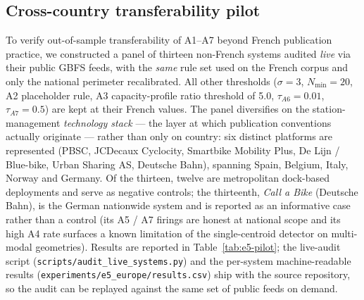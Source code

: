 \documentclass[11pt,a4paper]{article}
\begin{document}
\subsection{Cross-country transferability pilot}
To verify out-of-sample transferability of A1--A7 beyond French
publication practice, we constructed a panel of thirteen non-French
systems audited \emph{live} via their public GBFS feeds, with the
\emph{same} rule set used on the French corpus and only the
national perimeter recalibrated. All other thresholds ($\sigma =
3$, $N_{\min} = 20$, A2 placeholder rule, A3 capacity-profile
ratio threshold of 5.0, $\tau_{A6} = 0.01$, $\tau_{A7} = 0.5$) are
kept at their French values. The panel diversifies on the
station-management \emph{technology stack} --- the layer at which
publication conventions actually originate --- rather than only on
country: six distinct platforms are represented (PBSC, JCDecaux
Cyclocity, Smartbike Mobility Plus, De Lijn / Blue-bike, Urban
Sharing AS, Deutsche Bahn), spanning Spain, Belgium, Italy,
Norway and Germany. Of the thirteen, twelve are metropolitan
dock-based deployments and serve as negative controls; the
thirteenth, \emph{Call a Bike} (Deutsche Bahn), is the German
nationwide system and is reported as an informative case rather
than a control (its A5 / A7 firings are honest at national scope
and its high A4 rate surfaces a known limitation of the
single-centroid detector on multi-modal geometries). Results are
reported in Table~\ref{tab:e5-pilot}; the live-audit script
(\texttt{scripts/audit\_live\_systems.py}) and the per-system
machine-readable results
(\texttt{experiments/e5\_europe/results.csv}) ship with the source
repository, so the audit can be replayed against the same set of
public feeds on demand.
\end{document}
